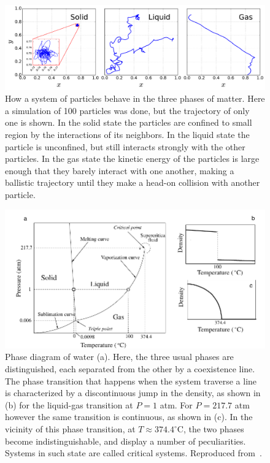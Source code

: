 \begin{figure}
\begin{center}
    \includegraphics[width=\textwidth]{chapters/ch2-crit/figs/phases}
\end{center}
\caption{How a system of particles behave in the three phases of matter. Here a
    simulation of 100 particles was done, but the trajectory of only one is
    shown. In the solid state the particles are confined to small region by
    the interactions of its neighbors. In the liquid state the particle is
    unconfined, but still interacts strongly with the other particles. In the
    gas state the kinetic energy of the particles is large enough that they
    barely interact with one another, making a ballistic trajectory until
    they make a head-on collision with another particle.}
\label{fig:phases}
\end{figure}


\begin{figure}
\begin{center}
    \includegraphics[width=\textwidth]{chapters/ch2-crit/figs/water}
\end{center}
\caption{Phase diagram of water (a). Here, the three usual phases are
    distinguished, each separated from the other by a coexistence line. The
    phase transition that happens when the system traverse a line is
    characterized by a discontinuous jump in the density, as shown in (b) for
    the liquid-gas transition at $P=1$ atm. For $P=217.7$ atm however the same
    transition is continuous, as shown in (c). In the vicinity of this phase
    transition, at $T\approx374.4^\circ$C, the two phases become
    indistinguishable, and display a number of peculiarities. Systems in such
    state are called critical systems. Reproduced from~\cite{Sole2011}.}
\label{fig:water}
\end{figure}


